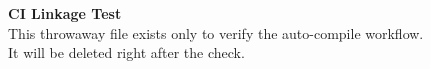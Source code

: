 \documentclass[letterpaper,11pt]{article}
\begin{document}
\begin{center}
    \textbf{\Large CI Linkage Test}\\[4pt]
    This throwaway file exists only to verify the auto-compile workflow.\\
    It will be deleted right after the check.
\end{center}
\end{document}
